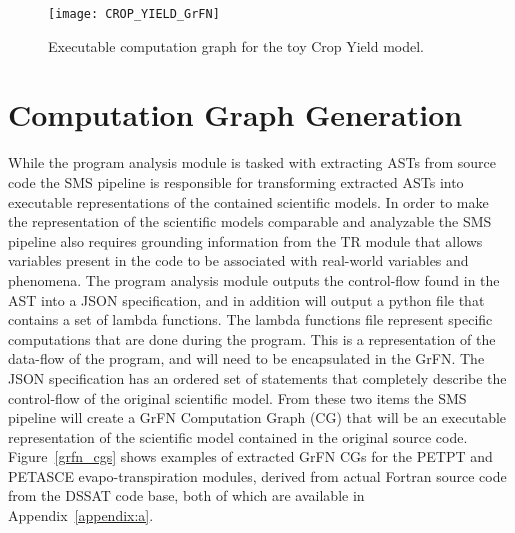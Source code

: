 \FloatBarrier
\begin{figure}[!htbp]
    \label{crop_grfn_cg}
    \centering
    \texttt{[image: CROP\_YIELD\_GrFN]}%
    \caption[Crop Yield Model GrFN CG]{Executable computation graph for the toy Crop Yield model.}
\end{figure}
\FloatBarrier

\section{Computation Graph Generation\label{sec:cg_gen}}
While the program analysis module is tasked with extracting ASTs from source code the SMS pipeline is responsible for transforming extracted ASTs into executable representations of the contained scientific models.
In order to make the representation of the scientific models comparable and analyzable the SMS pipeline also requires grounding information from the TR module that allows variables present in the code to be associated with real-world variables and phenomena.
The program analysis module outputs the control-flow found in the AST into a JSON specification, and in addition will output a python file that contains a set of lambda functions.
The lambda functions file represent specific computations that are done during the program.
This is a representation of the data-flow of the program, and will need to be encapsulated in the GrFN.
The JSON specification has an ordered set of statements that completely describe the control-flow of the original scientific model.
From these two items the SMS pipeline will create a GrFN Computation Graph (CG) that will be an executable representation of the scientific model contained in the original source code.
Figure~\ref{grfn_cgs} shows examples of extracted GrFN CGs for the PETPT and PETASCE evapo-transpiration modules, derived from actual Fortran source code from the DSSAT code base, both of which are available in Appendix~\ref{appendix:a}.

